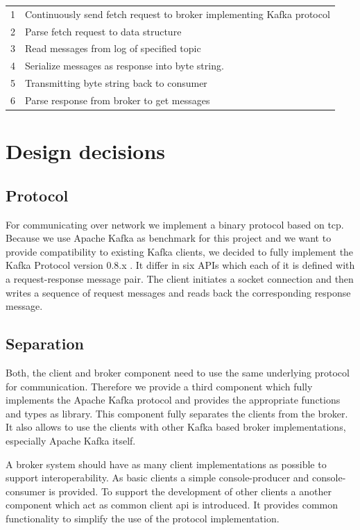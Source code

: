 \begin{table}[h]
\begin{tabular}{ll}
1  & Continuously send fetch request to broker implementing Kafka protocol \\
2  & Parse fetch request to data structure                                 \\
3  & Read messages from log of specified topic                             \\
4  & Serialize messages as response into byte string.                      \\
5  & Transmitting byte string back to consumer                             \\
6  & Parse response from broker to get messages                           
\end{tabular}
\end{table}

\section{Design decisions}
\subsection{Protocol}
For communicating over network we implement a binary protocol based on tcp.
Because we use Apache Kafka as benchmark for this project and we want to provide
compatibility to existing Kafka clients, we decided to fully implement the Kafka
Protocol version 0.8.x . It differ in six APIs which each of it is
defined with a request-response message pair. The client initiates a socket connection and then
writes a sequence of request messages and reads back the corresponding response
message. 

\subsection{Separation} 
Both, the client and broker component need to use the same underlying protocol for
communication. Therefore we provide a third component which fully implements the Apache Kafka
protocol  and provides the appropriate functions and types as library.
This component fully separates the clients from the broker. It also allows to
use the clients with other Kafka based broker implementations, especially Apache
Kafka itself. 

A broker system should have as many client implementations as possible to
support interoperability. As basic clients a simple console-producer and
console-consumer is provided. To support the development of other clients a
another component which act as common client api is introduced. It provides
common functionality to simplify the use of the protocol implementation. 

